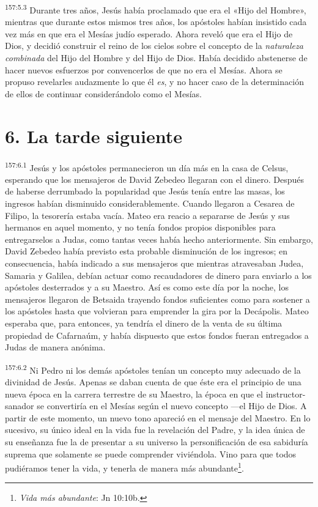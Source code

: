 \par
\textsuperscript{157:5.3} Durante tres años, Jesús había proclamado que era el «Hijo del Hombre», mientras que durante estos mismos tres años, los apóstoles habían insistido cada vez más en que era el Mesías judío esperado. Ahora reveló que era el Hijo de Dios, y decidió construir el reino de los cielos sobre el concepto de la \textit{naturaleza combinada} del Hijo del Hombre y del Hijo de Dios. Había decidido abstenerse de hacer nuevos esfuerzos por convencerlos de que no era el Mesías. Ahora se propuso revelarles audazmente lo que él \textit{es}, y no hacer caso de la determinación de ellos de continuar considerándolo como el Mesías.

\section*{6. La tarde siguiente}
\par
\textsuperscript{157:6.1} Jesús y los apóstoles permanecieron un día más en la casa de Celsus, esperando que los mensajeros de David Zebedeo llegaran con el dinero. Después de haberse derrumbado la popularidad que Jesús tenía entre las masas, los ingresos habían disminuido considerablemente. Cuando llegaron a Cesarea de Filipo, la tesorería estaba vacía. Mateo era reacio a separarse de Jesús y sus hermanos en aquel momento, y no tenía fondos propios disponibles para entregarselos a Judas, como tantas veces había hecho anteriormente. Sin embargo, David Zebedeo había previsto esta probable disminución de los ingresos; en consecuencia, había indicado a sus mensajeros que mientras atravesaban Judea, Samaria y Galilea, debían actuar como recaudadores de dinero para enviarlo a los apóstoles desterrados y a su Maestro. Así es como este día por la noche, los mensajeros llegaron de Betsaida trayendo fondos suficientes como para sostener a los apóstoles hasta que volvieran para emprender la gira por la Decápolis. Mateo esperaba que, para entonces, ya tendría el dinero de la venta de su última propiedad de Cafarnaúm, y había dispuesto que estos fondos fueran entregados a Judas de manera anónima.

\par
\textsuperscript{157:6.2} Ni Pedro ni los demás apóstoles tenían un concepto muy adecuado de la divinidad de Jesús. Apenas se daban cuenta de que éste era el principio de una nueva época en la carrera terrestre de su Maestro, la época en que el instructor-sanador se convertiría en el Mesías según el nuevo concepto ---el Hijo de Dios. A partir de este momento, un nuevo tono apareció en el mensaje del Maestro. En lo sucesivo, su único ideal en la vida fue la revelación del Padre, y la idea única de su enseñanza fue la de presentar a su universo la personificación de esa sabiduría suprema que solamente se puede comprender viviéndola. Vino para que todos pudiéramos tener la vida, y tenerla de manera más abundante\footnote{\textit{Vida más abundante}: Jn 10:10b.}.

